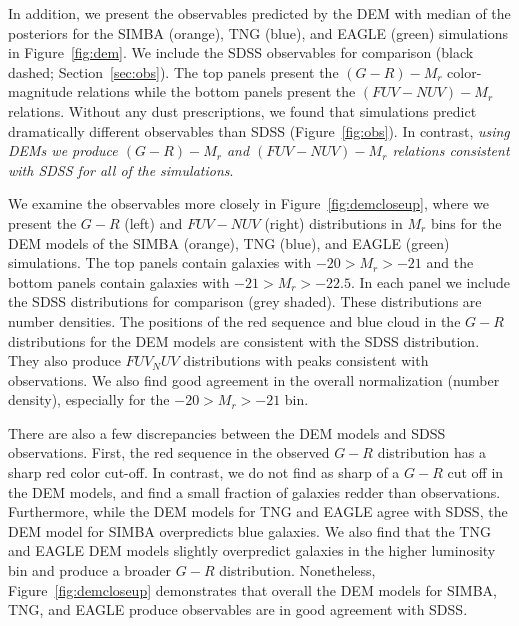 In addition, we present the observables predicted by the DEM with median of the
posteriors for the SIMBA (orange), TNG (blue), and EAGLE (green) simulations 
in Figure~\ref{fig:dem}. We include the SDSS observables for comparison
(black dashed; Section~\ref{sec:obs}). The top panels present the $(G-R) - M_r$ 
color-magnitude relations while the bottom panels present the $(FUV-NUV) - M_r$
relations. Without any dust prescriptions, we found that simulations predict
dramatically different observables than SDSS (Figure~\ref{fig:obs}). 
In contrast, {\em using DEMs we produce $(G-R) - M_r$ and $(FUV-NUV) - M_r$
relations consistent with SDSS for all of the simulations}. 

We examine the observables more closely in Figure~\ref{fig:demcloseup}, where
we present the $G-R$ (left) and $FUV-NUV$ (right) distributions in $M_r$ 
bins for the DEM models of the SIMBA (orange), TNG (blue), and EAGLE (green) 
simulations. The top panels contain galaxies with $-20 > M_r > -21$ and the 
bottom panels contain galaxies with $-21 > M_r > -22.5$. In each panel we 
include the SDSS distributions for comparison (grey shaded). These distributions are 
number densities. The positions of the red sequence and blue cloud in the $G-R$
distributions for the DEM models are consistent with the SDSS distribution. 
They also produce $FUV_NUV$ distributions with peaks consistent with
observations. We also find good agreement in the overall normalization
(number density), especially for the $-20 > M_r > -21$ bin. 

There are also a few discrepancies between the DEM models and SDSS observations. 
First, the red sequence in the observed $G-R$ distribution has a sharp red color 
cut-off.  In contrast, we do not find as sharp of a $G-R$ cut off in the DEM models, 
and find a small fraction of galaxies redder than observations. 
Furthermore, while the DEM models for TNG and EAGLE agree with SDSS, the DEM
model for SIMBA overpredicts blue galaxies.  We also find that the TNG and EAGLE DEM models slightly overpredict 
galaxies in the higher luminosity bin and produce a broader $G-R$ distribution.
Nonetheless, Figure~\ref{fig:demcloseup} demonstrates that overall the DEM
models for SIMBA, TNG, and EAGLE produce observables are in good agreement 
with SDSS.

